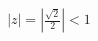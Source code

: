 \documentclass[preview]{standalone}
\begin{document}
\begin{align*}
|z| = |\frac{\sqrt{2}}{2}| < 1
\end{align*}
\end{document}
